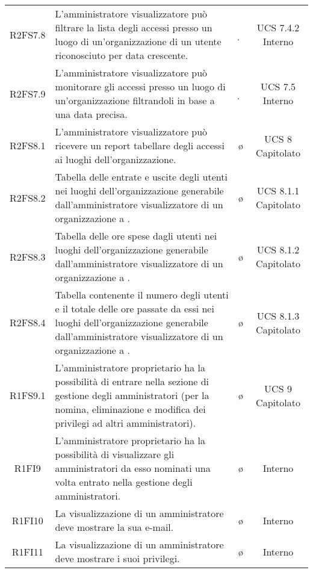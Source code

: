 {\begin{longtable}{ c C{6.5cm} c c}
R2FS7.8 & L’amministratore visualizzatore può filtrare la lista degli accessi presso un luogo di un'organizzazione di un utente riconosciuto per data crescente. & \d & UCS 7.4.2 Interno \\

R2FS7.9 & L'amministratore visualizzatore può monitorare gli accessi presso un luogo di un'organizzazione filtrandoli in base a una data precisa. & \d & UCS 7.5 Interno\\

R2FS8.1 & L'amministratore visualizzatore può ricevere un report tabellare degli accessi ai luoghi dell'organizzazione. & \o & UCS 8 Capitolato\\

R2FS8.2 &  Tabella delle entrate e uscite degli utenti nei luoghi dell'organizzazione generabile dall'amministratore visualizzatore di un organizzazione a . & \o & UCS 8.1.1 Capitolato\\

R2FS8.3 & Tabella delle ore spese dagli utenti nei luoghi dell'organizzazione generabile dall'amministratore visualizzatore di un organizzazione a . & \o & UCS 8.1.2 Capitolato\\

R2FS8.4 & Tabella contenente il numero degli utenti e il totale delle ore passate da essi nei luoghi dell'organizzazione generabile dall'amministratore visualizzatore di un organizzazione a . & \o & UCS 8.1.3 Capitolato\\


R1FS9.1 & L'amministratore proprietario ha la possibilità di entrare nella sezione di gestione degli amministratori (per la nomina, eliminazione e modifica dei privilegi ad altri amministratori). & \o & UCS 9 Capitolato \\

R1FI9 & L'amministratore proprietario ha la possibilità di visualizzare gli amministratori da esso nominati una volta entrato nella gestione degli amministratori. & \o & Interno \\

R1FI10 & La visualizzazione di un amministratore deve mostrare la sua e-mail. & \o & Interno \\

R1FI11 & La visualizzazione di un amministratore deve mostrare i suoi privilegi. & \o & Interno \\


\end{longtable}}
